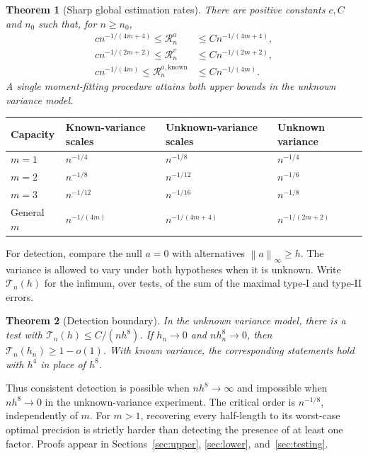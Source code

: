 \documentclass[11pt,a4paper]{article}
\numberwithin{equation}{section}
\newtheorem{theorem}{Theorem}[section]
\theoremstyle{definition}
\theoremstyle{remark}
\newcommand{\norm}[1]{\left\lVert#1\right\rVert}
\newcommand{\risk}{\mathcal R}
\begin{document}
\begin{theorem}[Sharp global estimation rates]
\label{thm:main}
There are positive constants $c,C$ and $n_0$ such that, for $n\ge n_0$,
\begin{align}
 c n^{-1/(4m+4)}\le\risk^a_n&\le C n^{-1/(4m+4)},
 \label{eq:unknownrate}\\
 c n^{-1/(2m+2)}\le\risk^v_n&\le C n^{-1/(2m+2)},
 \label{eq:variancerate}\\
 c n^{-1/(4m)}\le\risk^{a,\mathrm{known}}_n&\le C n^{-1/(4m)}.
 \label{eq:knownrate}
\end{align}
A single moment-fitting procedure attains both upper bounds in the unknown
variance model.
\end{theorem}

\begin{center}
\begin{tabular}{@{}llll@{}}
\toprule
Capacity & Known-variance scales & Unknown-variance scales & Unknown variance\\
\midrule
$m=1$ & $n^{-1/4}$ & $n^{-1/8}$ & $n^{-1/4}$\\
$m=2$ & $n^{-1/8}$ & $n^{-1/12}$ & $n^{-1/6}$\\
$m=3$ & $n^{-1/12}$ & $n^{-1/16}$ & $n^{-1/8}$\\
General $m$ & $n^{-1/(4m)}$ & $n^{-1/(4m+4)}$ & $n^{-1/(2m+2)}$\\
\bottomrule
\end{tabular}
\end{center}

For detection, compare the null $a=0$ with alternatives
$\norm a_\infty\ge h$. The variance is allowed to vary under both hypotheses
when it is unknown. Write $\mathcal T_n(h)$ for the infimum, over tests, of
the sum of the maximal type-I and type-II errors.

\begin{theorem}[Detection boundary]
\label{thm:detectionintro}
In the unknown variance model, there is a test with
$\mathcal T_n(h)\le C/(nh^8)$. If $h_n\to0$ and $nh_n^8\to0$, then
$\mathcal T_n(h_n)\ge1-o(1)$. With known variance, the corresponding statements
hold with $h^4$ in place of $h^8$.
\end{theorem}

Thus consistent detection is possible when $nh^8\to\infty$ and impossible
when $nh^8\to0$ in the unknown-variance experiment. The critical order is
$n^{-1/8}$, independently of $m$. For $m>1$, recovering every half-length to
its worst-case optimal precision is strictly harder than detecting the
presence of at least one factor. Proofs appear in Sections~\ref{sec:upper},
\ref{sec:lower}, and~\ref{sec:testing}.
\end{document}
